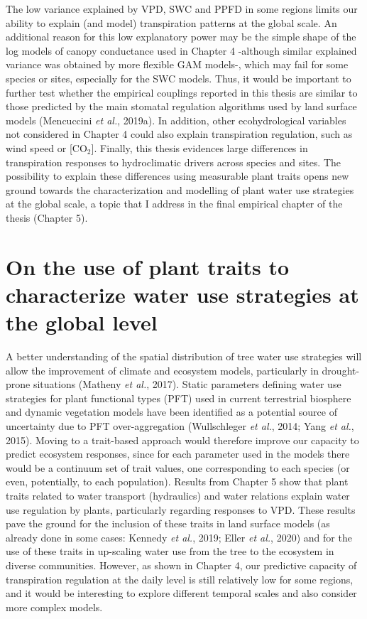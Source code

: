 \documentclass[11pt,twoside]{reedthesis}
\begin{document}
The low variance explained by VPD, SWC and PPFD in some regions limits
our ability to explain (and model) transpiration patterns at the global
scale. An additional reason for this low explanatory power may be the
simple shape of the log models of canopy conductance used in Chapter 4
-although similar explained variance was obtained by more flexible GAM
models-, which may fail for some species or sites, especially for the
SWC models. Thus, it would be important to further test whether the
empirical couplings reported in this thesis are similar to those
predicted by the main stomatal regulation algorithms used by land
surface models (Mencuccini \emph{et al.}, 2019a). In addition, other
ecohydrological variables not considered in Chapter 4 could also explain
transpiration regulation, such as wind speed or {[}\(\text{CO}_2\){]}.
Finally, this thesis evidences large differences in transpiration
responses to hydroclimatic drivers across species and sites. The
possibility to explain these differences using measurable plant traits
opens new ground towards the characterization and modelling of plant
water use strategies at the global scale, a topic that I address in the
final empirical chapter of the thesis (Chapter 5).\par

\section{On the use of plant traits to characterize water use strategies
at the global
level}\label{on-the-use-of-plant-traits-to-characterize-water-use-strategies-at-the-global-level}

A better understanding of the spatial distribution of tree water use
strategies will allow the improvement of climate and ecosystem models,
particularly in drought-prone situations (Matheny \emph{et al.}, 2017).
Static parameters defining water use strategies for plant functional
types (PFT) used in current terrestrial biosphere and dynamic vegetation
models have been identified as a potential source of uncertainty due to
PFT over-aggregation (Wullschleger \emph{et al.}, 2014; Yang \emph{et
al.}, 2015). Moving to a trait-based approach would therefore improve
our capacity to predict ecosystem responses, since for each parameter
used in the models there would be a continuum set of trait values, one
corresponding to each species (or even, potentially, to each
population). Results from Chapter 5 show that plant traits related to
water transport (hydraulics) and water relations explain water use
regulation by plants, particularly regarding responses to VPD. These
results pave the ground for the inclusion of these traits in land
surface models (as already done in some cases: Kennedy \emph{et al.},
2019; Eller \emph{et al.}, 2020) and for the use of these traits in
up-scaling water use from the tree to the ecosystem in diverse
communities. However, as shown in Chapter 4, our predictive capacity of
transpiration regulation at the daily level is still relatively low for
some regions, and it would be interesting to explore different temporal
scales and also consider more complex models.\par
\end{document}
